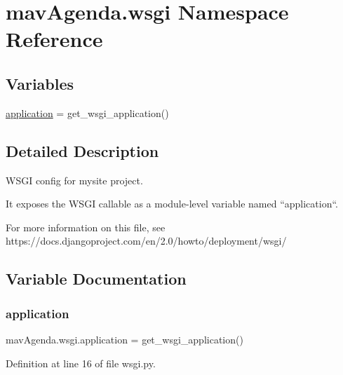 \hypertarget{namespacemavAgenda_1_1wsgi}{}\section{mav\+Agenda.\+wsgi Namespace Reference}
\label{namespacemavAgenda_1_1wsgi}
\subsection*{Variables}
\begin{DoxyCompactItemize}
\item 
\mbox{\hyperlink{namespacemavAgenda_1_1wsgi_aae226973e60e3685aded7ce165fbe8a0}{application}} = get\+\_\+wsgi\+\_\+application()
\end{DoxyCompactItemize}


\subsection{Detailed Description}
\begin{DoxyVerb}WSGI config for mysite project.

It exposes the WSGI callable as a module-level variable named ``application``.

For more information on this file, see
https://docs.djangoproject.com/en/2.0/howto/deployment/wsgi/
\end{DoxyVerb}
 

\subsection{Variable Documentation}
\mbox{\label{namespacemavAgenda_1_1wsgi_aae226973e60e3685aded7ce165fbe8a0}} 
\subsubsection{\texorpdfstring{application}{application}}
{\footnotesize\ttfamily mav\+Agenda.\+wsgi.\+application = get\+\_\+wsgi\+\_\+application()}



Definition at line 16 of file wsgi.\+py.

